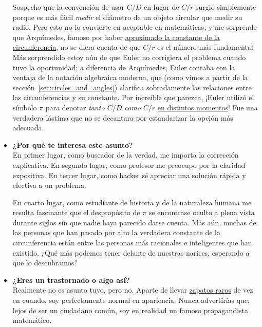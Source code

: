 \begin{itemize}
Sospecho que la convención de usar $C/D$ en lugar de $C/r$ surgió simplemente porque es más fácil \emph{medir} el diámetro de un objeto circular que medir su radio. Pero esto no lo convierte en aceptable en matemáticas, y me sorprende que Arquímedes, famoso por haber \href{http://itech.fgcu.edu/faculty/clindsey/mhf4404/archimedes/archimedes.html}{aproximado la constante de la circunferencia}, no se diera cuenta de que $C/r$ es el número más fundamental. Más sorprendido estoy aún de que Euler no corrigiera el problema cuando tuvo la oportunidad; a diferencia de Arquímedes, Euler contaba con la ventaja de la notación algebraica moderna, que (como vimos a partir de la sección~\ref{sec:circles_and_angles}) clarifica sobradamente las relaciones entre las circunferencias y su constante. Por increíble que parezca, ¡Euler utilizó el símbolo $\pi$ para denotar \emph{tanto $C/D$ como $C/r$} \href{https://en.wikipedia.org/wiki/Pi#Adoption_of_the_symbol_%CF%80}{en distintos momentos}! Fue una verdadera lástima que no se decantara por estandarizar la opción más adecuada.

  \item \textbf{¿Por qué te interesa este asunto?} \\ En primer lugar, como buscador de la verdad, me importa la corrección explicativa. En segundo lugar, como profesor me preocupo por la claridad expositiva. En tercer lugar, como hacker sé apreciar una solución rápida y efectiva a un problema.

En cuarto lugar, como estudiante de historia y de la naturaleza humana me resulta fascinante que el despropósito de $\pi$ se encontrase oculto a plena vista durante siglos sin que nadie haya parecido darse cuenta.  Más aún, muchas de las personas que han pasado por alto la verdadera constante de la circunferencia están entre las personas más racionales e inteligentes que han existido. ¿Qué más podemos tener delante de nuestras narices, esperando a que lo descubramos?


  \item \textbf{¿Eres un trastornado o algo así?} \\ Realmente no es asunto tuyo, pero no. Aparte de llevar \href{http://www.vibramfivefingers.com/}{zapatos raros} de vez en cuando, soy perfectamente normal en apariencia. Nunca advertirías que, lejos de ser un ciudadano común, soy en realidad un famoso propagandista matemático.



\end{itemize}
